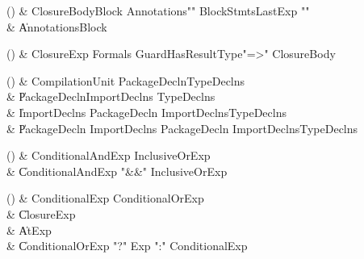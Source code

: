 \begin{bbgrammarappendix}{3.9in}

() & ClosureBodyBlock \label{prod:ClosureBodyBlock}  \:
         Annotations\opt \xcd"{" BlockStmts\opt LastExp \xcd"}" \\
 &    \| Annotations\opt Block \\

\end{bbgrammarappendix}

\begin{bbgrammarappendix}{4.0in}

() & ClosureExp \label{prod:ClosureExp}  \: Formals Guard\opt HasResultType\opt \xcd"=>" ClosureBody  \\


\end{bbgrammarappendix}

\begin{bbgrammarappendix}{3.5in}

() & CompilationUnit \label{prod:CompilationUnit}  \: PackageDecln\opt TypeDeclns\opt  \\

 &    \| PackageDecln\opt ImportDeclns TypeDeclns\opt \\
 &    \| ImportDeclns PackageDecln  ImportDeclns\opt  TypeDeclns\opt \\
 &    \| PackageDecln ImportDeclns PackageDecln  ImportDeclns\opt  TypeDeclns\opt \\

\end{bbgrammarappendix}

\begin{bbgrammarappendix}{3.3in}

() & ConditionalAndExp \label{prod:ConditionalAndExp}  \: InclusiveOrExp  \\

 &    \| ConditionalAndExp \xcd"&&" InclusiveOrExp \\

\end{bbgrammarappendix}

\begin{bbgrammarappendix}{3.6in}

() & ConditionalExp \label{prod:ConditionalExp}  \: ConditionalOrExp  \\

 &    \| ClosureExp \\
 &    \| AtExp \\
 &    \| ConditionalOrExp \xcd"?" Exp \xcd":" ConditionalExp \\

\end{bbgrammarappendix}

